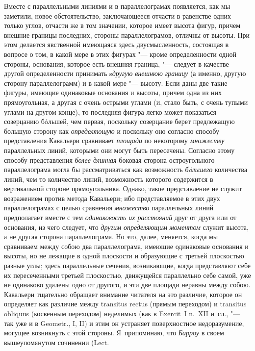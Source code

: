 Вместе с параллельными линиями и в параллелограмах появляется, как мы
заметили, новое обстоятельство, заключающееся отчасти в равенстве одних
только углов, отчасти же в том значении, которое имеет высота фигур, причем
внешние границы последних, стороны параллелограмов, отличны от высоты. При
этом делается явственной имеющаяся здесь двусмысленность, состоящая в
вопросе о том, в какой мере в этих фигурах "--- кроме определенности одной
стороны, основания, которое есть внешняя граница, "--- следует в качестве
другой определенности принимать s{\em другую внешнюю
границу} (а именно, другую сторону параллелограмм) и в какой мере "--- высоту.
Если даны две такие фигуры, имеющие одинаковые основания и высоты, причем
одна из них прямоугольная, а другая с очень острыми углами (и, стало быть,
с очень тупыми углами на другом конце), то последняя фигура легко может
показаться созерцанию бóльшей, чем первая, поскольку созерцание берет
предлежащую большую сторону как {\em определяющую} и
поскольку оно согласно способу представления Кавальери сравнивает
{\em площади} по некоторому
{\em множеству} параллельных линий, которыми они могут
быть пересечены. Согласно этому способу представления
{\em более длинная} боковая сторона остроугольного
параллелограма могла бы рассматриваться как возможность
{\em бóльшего} количества линий, чем то количество
линий, возможность которого содержится в вертикальной стороне
прямоугольника. Однако, такое представление не служит возражением против
метода Кавальери; ибо представляемое в этих двух параллелограмах с целью
сравнения {\em множество} параллельных линий
предполагает вместе с тем {\em одинаковость их
расстояний} друг от друга или от основания, из чего следует, что
{\em другим определяющим моментом} служит высота, а не
другая сторона параллелограма. Но это, далее, меняется, когда мы сравниваем
между собою два параллелограма, имеющие одинаковые основания и высоты, но
не лежащие в одной плоскости и образующие с третьей плоскостью разные углы;
здесь параллельные сечения, возникающие, когда представляют себе их
пересеченными третьей плоскостью, движущейся параллельно себе самой, уже не
одинаково удалены одно от другого, и эти две площади неравны между собою.
Кавальери тщательно обращает внимание читателя на это различие, которое он
определяет как различие между transitus rectus (прямым переходом) и
transitus obliquus (косвенным переходом) неделимых (как в Exercit~I n.~XII
и~сл., "--- так уже и в Geometr., I, II) и этим он устраняет поверхностное
недоразумение, могущее возникнуть с этой стороны. Я~припоминаю, что
{\em Барроу} в своем вышеупомянутом сочинении (Lect.
